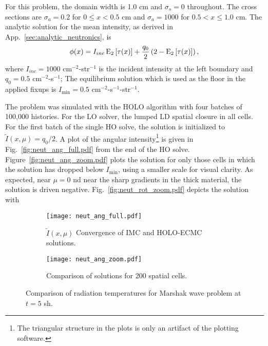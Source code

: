 For this problem, the domain width is 1.0 cm and $\sigma_s=0$ throughout.  The cross
sections are $\sigma_a=0.2$ \invcm for $0\leq x <0.5$ cm and $\sigma_a=1000$ for
$0.5<x\leq1.0$ cm.  The analytic solution
for the mean intensity, as derived in App.~\ref{sec:analytic_neutronics}, is
\begin{equation}
    \phi(x) = I_{inc}\operatorname{E}_{2}\left[\tau(x)\right] + \frac{q_0}{2} \left(2 -
    \operatorname{E}_{2}\left[\tau(x)\right]\right),
\end{equation}
where $I_{inc}=1000$ cm$^{-2}$-str$^{-1}$ is the incident intensity at the left
boundary and $q_0 = 0.5$ cm$^{-2}$-s$^{-1}$; The equilibrium solution which is
used as the floor in the applied fixups is $I_{\min} = 0.5$ cm$^{-2}$-s$^{-1}$-str$^{-1}$.

The problem was simulated with the HOLO algorithm with four batches of 100,000 histories.
For the LO solver, the lumped LD spatial closure in all cells. 
For the first batch of the single HO solve, the solution is initialized to $\tilde I(x,\mu)=q_0/2$.
A plot of the angular
intensity\footnote{The triangular structure in the plots is only an artifact of the plotting
software.} is given in Fig.~\ref{fig:neut_ang_full.pdf} from the end of the HO solve.
Figure~\ref{fig:neut_ang_zoom.pdf} plots the solution for only those cells in which the solution has dropped
below $I_{\min}$, using a smaller scale for visual clarity.  As expected, near $\mu=0$  nd
near the sharp gradients in the thick material, the solution is driven negative.
Fig.~\ref{fig:neut_rot_zoom.pdf} depicts the solution with 
\begin{figure}[hp]
    \centering
\begin{subfigure}{0.7\textwidth}
  \centering
    \texttt{[image: neut\_ang\_full.pdf]}
    \caption{\label{fig:neut_ang_full} $\tilde I(x,\mu)$ Convergence of IMC and HOLO-ECMC solutions.}
\end{subfigure}
\begin{subfigure}{0.7\textwidth}
  \centering
  \texttt{[image: neut\_ang\_zoom.pdf]}
  \caption{\label{k_200_compare}  Comparison of solutions for 200 spatial cells. }
\end{subfigure}
\caption{Comparison of radiation temperatures for Marshak wave problem at ${t=5}$ sh.}
\end{figure}





